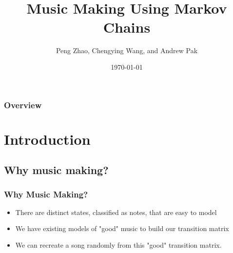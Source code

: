 \documentclass{beamer}
\title[Music Making]{Music Making Using Markov Chains} %
\author{Peng Zhao, Chengying Wang, and Andrew Pak} %
\institute[SC] %
{
Swarthmore College \\ %
\medskip
\textit{} %
}
\date{\today} %
\begin{document}
\begin{frame}
\titlepage %
\end{frame}

\begin{frame}
\frametitle{Overview} %
\tableofcontents %
\end{frame}


\section{Introduction} %

\subsection{Why music making?} %
\begin{frame}
\frametitle{Why Music Making?}
\begin{itemize}
\item There are distinct states, classified as notes, that are easy to model
\item We have existing models of "good" music to build our transition matrix
\item We can recreate a song randomly from this "good" transition matrix.
\end{itemize}
\end{frame}
\end{document}
